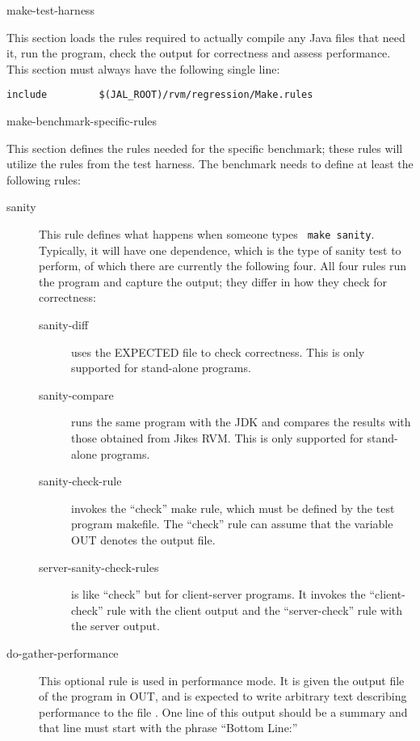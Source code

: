 \begin{description}
\begin{Label}{make-test-harness}
\item[Include the test harness makefile]
  This section loads the rules
required to actually compile any Java files that need it, run the
program, check the output for correctness and assess performance.
This section must always have the following single line:
\begin{verbatim}
include         $(JAL_ROOT)/rvm/regression/Make.rules
\end{verbatim}
\end{Label}

\begin{Label}{make-benchmark-specific-rules}
\item[Define benchmark-specific rules]
  This section defines the rules
needed for the specific benchmark; these rules will utilize the rules
from the test harness.  The benchmark needs to define at least the
following rules:

\begin{description}

\item[sanity] This rule defines what happens when someone types {\tt
make sanity}.  Typically, it will have one dependence, which is the type
of sanity test to perform, of which there are currently the following
four.  All four rules run the program and capture the output; they
differ in how they check for correctness:
\begin{description}
\item[sanity-diff] uses the EXPECTED file to check correctness.  This
is only supported for stand-alone programs.
\item[sanity-compare] runs the same program with the JDK and compares
the results with those obtained from Jikes RVM.  This is only supported for
stand-alone programs. 
\item[sanity-check-rule] invokes the ``check'' make rule, which must be
defined by the test program makefile.  The ``check'' rule can assume
that the variable OUT denotes the output file.
\item[server-sanity-check-rules] is like ``check'' but for
client-server programs.  It invokes the ``client-check'' rule with the
client output and the ``server-check'' rule with the server output.
\end{description}

\item[do-gather-performance]  This optional rule is used in
performance mode.  It is given the output file of the program in OUT,
and is expected to write arbitrary text describing performance to the
file .  One line of this output should be a summary and that
line must start with the phrase ``Bottom Line:''


\end{description}
\end{Label}
\end{description}
